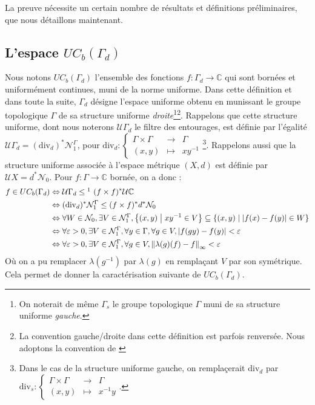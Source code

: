\documentclass[a4paper,12pt]{article}
\newcommand{\C}{\mathbb{C}}
\newcommand{\norm}[1]{\left\Vert #1\right\Vert}
\newcommand{\abs}[1]{\left\vert#1\right\vert}
\newcommand{\set}[1]{\left\{ #1 \right\}}
\newcommand\fundef[3]{#1: \left\{\begin{array}{ccc}#2\\#3\end{array}\right.}
\newcommand{\tq}{\;\middle|\;}
\newcommand{\inv}{^{-1}}
\newcommand{\nhds}{\mathcal{N}}
\renewcommand{\iff}{\Leftrightarrow}
\newcommand{\divop}{\mathrm{div}}
\newcommand{\TODO}[1]{}%
\begin{document}
La preuve nécessite un certain nombre de résultats et définitions préliminaires, que nous détaillons maintenant. 

\TODO{Dans les sections suivantes, ajouter un peu de motivation}

\subsection{L'espace \texorpdfstring{$UC_b(\Gamma_d)$}{des fonctions uniformément continues bornées}}

Nous notons $UC_b(\Gamma_d)$ l'ensemble des fonctions $f:\Gamma_d\to\C$ qui sont bornées et uniformément 
continues, muni de la norme uniforme. Dans cette définition et dans toute la suite, $\Gamma_d$ désigne l'espace uniforme obtenu 
en munissant le groupe topologique $\Gamma$ de sa structure uniforme \emph{droite}\footnote{On noterait de même $\Gamma_s$
le groupe topologique $\Gamma$ muni de sa structure uniforme \emph{gauche}.}\footnote{La convention \og{}gauche/droite\fg{} 
dans cette définition est parfois renversée. Nous adoptons la convention de \cite[Bourbaki, \textit{Topologie Générale}]{bourbaki2007topologie}}.
Rappelons que cette structure uniforme, dont nous noterons $\mathcal{U}\Gamma_d$ le filtre des entourages,
est définie par l'égalité $\mathcal{U}\Gamma_d=(\divop_d)^*\nhds_1^\Gamma$, pour 
$\fundef{\divop_d}{\Gamma\times\Gamma&\to&\Gamma}{(x, y)&\mapsto&x y\inv}$\footnote{Dans le cas de la structure 
uniforme gauche, on remplaçerait $\divop_d$ par $\fundef{\divop_s}{\Gamma\times\Gamma&\to&\Gamma}{(x, y)&\mapsto&x\inv y}$.}.
Rappelons aussi que la structure uniforme associée à l'espace métrique $(X, d)$ est définie par 
$\mathcal{U}X = d^*\nhds_0$. 
Pour $f:\Gamma\to\C$ bornée, on a donc : 
\begin{align}
    f\in UC_b(\Gamma_d)
        &\iff \mathcal{U}\Gamma_d \le\footnotemark\ (f\times f)^*\mathcal{U}\C \nonumber \\
        &\iff (\divop_d)^*\nhds_1^\Gamma \le (f\times f)^*d^*\nhds_0 \nonumber \\
        &\iff \forall W\in\nhds_0, \exists V\in\nhds_1^\Gamma, \set{(x, y)\tq x y\inv\in V} \subseteq \set{(x, y)\tq \abs{f(x)-f(y)}\in W} \nonumber \\
        &\iff \forall \varepsilon>0, \exists V\in\nhds_1^\Gamma, \forall y\in\Gamma, \forall g\in V, \abs{f(gy)-f(y)} < \varepsilon \nonumber \\
        &\iff \forall \varepsilon>0, \exists V\in\nhds_1^\Gamma, \forall g\in V, \norm{\lambda(g)(f) - f}_\infty < \varepsilon \label{UCB_explicit_cara}
\end{align}
Où on a pu remplacer $\lambda(g\inv)$ par $\lambda(g)$ en remplaçant $V$ par son symétrique. Cela permet de donner la caractérisation suivante de $UC_b(\Gamma_d)$.
\end{document}
